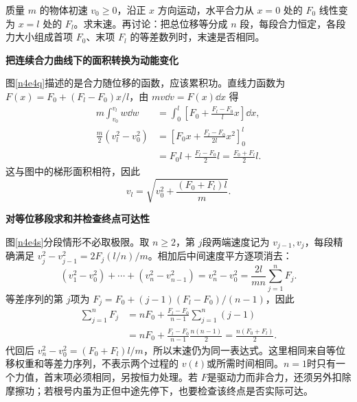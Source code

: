 \begin{question}\begin{example}[力随位置变化与等位移分段]\label{n4e4}
质量 $m$ 的物体初速 $v_0\ge0$，沿正 $x$ 方向运动，水平合力从 $x=0$ 处的 $F_0$ 线性变为 $x=l$ 处的 $F_l$。求末速。再讨论：把总位移等分成 $n$ 段，每段合力恒定，各段力大小组成首项 $F_0$、末项 $F_l$ 的等差数列时，末速是否相同。
\end{example}\end{question}
\begin{solution}\textbf{把连续合力曲线下的面积转换为动能变化}\par\nobreak
图\ref{n4e4q}描述的是合力随位移的函数，应该累积功。直线力函数为
$F(x)=F_0+(F_l-F_0)x/l$，由 $mv\dd v=F(x)\dd x$ 得
\begin{align*}
m\int_{v_0}^{v_l}w\dd w
&=\int_0^l\left[F_0+\frac{F_l-F_0}{l}x\right]\dd x,\\
\frac m2(v_l^2-v_0^2)
&=\left[F_0x+\frac{F_l-F_0}{2l}x^2\right]_0^l\\
&=F_0l+\frac{F_l-F_0}{2}l=\frac{F_0+F_l}{2}l.
\end{align*}
这与图中的梯形面积相符，因此
\[v_l=\sqrt{v_0^2+\frac{(F_0+F_l)l}{m}}.\]


\par\medskip{}\noindent\textbf{对等位移段求和并检查终点可达性}\par\nobreak
图\ref{n4e4s}分段情形不必取极限。取 $n\ge2$，第 $j$段两端速度记为 $v_{j-1},v_j$，每段精确满足 $v_j^2-v_{j-1}^2=2F_j(l/n)/m$。相加后中间速度平方逐项消去：
\[
 (v_1^2-v_0^2)+\cdots+(v_n^2-v_{n-1}^2)
 =v_n^2-v_0^2=\frac{2l}{mn}\sum_{j=1}^nF_j.
\]
等差序列的第 $j$项为 $F_j=F_0+(j-1)(F_l-F_0)/(n-1)$，因此
\begin{align*}
 \sum_{j=1}^nF_j
 &=nF_0+\frac{F_l-F_0}{n-1}\sum_{j=1}^n(j-1)\\
 &=nF_0+\frac{F_l-F_0}{n-1}\frac{n(n-1)}2
 =\frac{n(F_0+F_l)}2.
\end{align*}
代回后 $v_n^2-v_0^2=(F_0+F_l)l/m$，所以末速仍为同一表达式。这里相同来自等位移权重和等差力序列，不表示两个过程的 $v(t)$或所需时间相同。$n=1$时只有一个力值，首末项必须相同，另按恒力处理。若 $F$是驱动力而非合力，还须另外扣除摩擦功；若根号内虽为正但中途先停下，也要检查该终点是否实际可达。
\end{solution}

